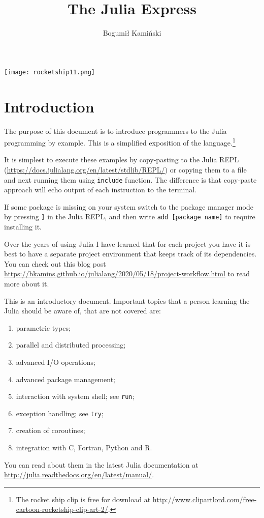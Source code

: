 \documentclass[10pt,a4paper]{article}
\begin{document}
\title{The Julia Express}
\author{Bogumił Kamiński}
\maketitle

{\centering
\texttt{[image: rocketship11.png]}\par
}

\tableofcontents

\section{Introduction}
The purpose of this document is to introduce programmers to the Julia
programming by example. This is a simplified exposition of the
language.\footnote{The rocket ship clip is free for download at
\url{http://www.clipartlord.com/free-cartoon-rocketship-clip-art-2/}.}

It is simplest to execute these examples by copy-pasting to the Julia REPL
(\url{https://docs.julialang.org/en/latest/stdlib/REPL/}) or copying them to a
file and next running them using \lstinline|include| function. The difference is
that copy-paste approach will echo output of each instruction to the terminal.

If some package is missing on your system switch to the package manager mode by
pressing \lstinline|]| in the Julia REPL, and then write
\lstinline|add [package name]| to require installing it.

Over the years of using Julia I have learned that for each project you have it
is best to have a separate project environment that keeps track of its
dependencies. You can check out this blog post
\url{https://bkamins.github.io/julialang/2020/05/18/project-workflow.html} to
read more about it.

This is an introductory document. Important topics that a person learning the
Julia should be aware of, that are not covered are:
\begin{enumerate}[label=\arabic*),nolistsep]
  \item parametric types;
  \item parallel and distributed processing;
  \item advanced I/O operations;
  \item advanced package management;
  \item interaction with system shell; see \lstinline|run|;
  \item exception handling; see \lstinline|try|;
  \item creation of coroutines;
  \item integration with C, Fortran, Python and R.
\end{enumerate}
You can read about them in the latest Julia documentation at
\url{http://julia.readthedocs.org/en/latest/manual/}.
\end{document}
